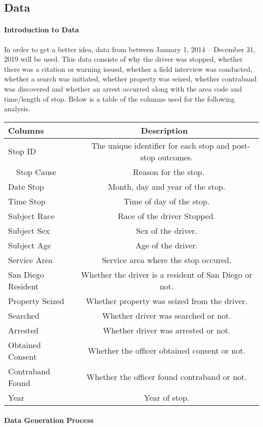 \documentclass[11pt]{article}
\begin{document}
    \subsection{Data}\label{data}

    \paragraph{Introduction to Data}\label{introduction-to-data}

    In order to get a better idea, data from between January 1, 2014 --
December 31, 2019 will be used. This data consists of why the driver was
stopped, whether there was a citation or warning issued, whether a field
interview was conducted, whether a search was initiated, whether
property was seized, whether contraband was discovered and whether an
arrest occurred along with the area code and time/length of stop. Below
is a table of the columns used for the following analysis.

    \begin{longtable}[]{@{}lc@{}}
\toprule
Columns~~~ & ~~~~~Description~~~~~~\tabularnewline
\midrule
\endhead
Stop ID & ~~The unique identifier for each stop and post-stop
outcomes.\tabularnewline
~~Stop Cause & ~~~~Reason for the stop.~~~\tabularnewline
Date Stop & Month, day and year of the stop.\tabularnewline
Time Stop & Time of day of the stop.\tabularnewline
Subject Race~~ & Race of the driver Stopped.\tabularnewline
Subject Sex & Sex of the driver.\tabularnewline
Subject Age & Age of the driver.\tabularnewline
Service Area & Service area where the stop occured.\tabularnewline
San Diego Resident & Whether the driver is a resident of San Diego or
not.\tabularnewline
Property Seized & Whether property was seized from the
driver.\tabularnewline
Searched & Whether driver was searched or not.\tabularnewline
Arrested & Whether driver was arrested or not.\tabularnewline
Obtained Consent & Whether the officer obtained consent or
not.\tabularnewline
Contraband Found & Whether the officer found contraband or
not.\tabularnewline
Year & Year of stop.\tabularnewline
\bottomrule
\end{longtable}

    \paragraph{Data Generation Process}\label{data-generation-process}
\end{document}
